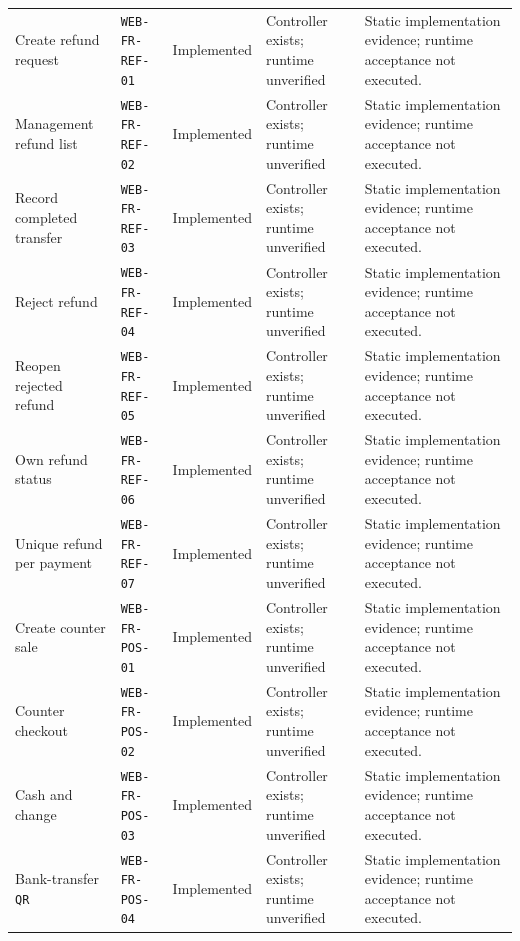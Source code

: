 \begin{longtable}{@{}P{0.19000\SRSWidth}P{0.18000\SRSWidth}P{0.15000\SRSWidth}P{0.20000\SRSWidth}P{0.28000\SRSWidth}@{}}
Create refund request & \texttt{WEB-\allowbreak{}FR-\allowbreak{}REF-\allowbreak{}01} & Implemented & Controller exists; runtime unverified & Static implementation evidence; runtime acceptance not executed. \\[3pt]
Management refund list & \texttt{WEB-\allowbreak{}FR-\allowbreak{}REF-\allowbreak{}02} & Implemented & Controller exists; runtime unverified & Static implementation evidence; runtime acceptance not executed. \\[3pt]
Record completed transfer & \texttt{WEB-\allowbreak{}FR-\allowbreak{}REF-\allowbreak{}03} & Implemented & Controller exists; runtime unverified & Static implementation evidence; runtime acceptance not executed. \\[3pt]
Reject refund & \texttt{WEB-\allowbreak{}FR-\allowbreak{}REF-\allowbreak{}04} & Implemented & Controller exists; runtime unverified & Static implementation evidence; runtime acceptance not executed. \\[3pt]
Reopen rejected refund & \texttt{WEB-\allowbreak{}FR-\allowbreak{}REF-\allowbreak{}05} & Implemented & Controller exists; runtime unverified & Static implementation evidence; runtime acceptance not executed. \\[3pt]
Own refund status & \texttt{WEB-\allowbreak{}FR-\allowbreak{}REF-\allowbreak{}06} & Implemented & Controller exists; runtime unverified & Static implementation evidence; runtime acceptance not executed. \\[3pt]
Unique refund per payment & \texttt{WEB-\allowbreak{}FR-\allowbreak{}REF-\allowbreak{}07} & Implemented & Controller exists; runtime unverified & Static implementation evidence; runtime acceptance not executed. \\[3pt]
Create counter sale & \texttt{WEB-\allowbreak{}FR-\allowbreak{}POS-\allowbreak{}01} & Implemented & Controller exists; runtime unverified & Static implementation evidence; runtime acceptance not executed. \\[3pt]
Counter checkout & \texttt{WEB-\allowbreak{}FR-\allowbreak{}POS-\allowbreak{}02} & Implemented & Controller exists; runtime unverified & Static implementation evidence; runtime acceptance not executed. \\[3pt]
Cash and change & \texttt{WEB-\allowbreak{}FR-\allowbreak{}POS-\allowbreak{}03} & Implemented & Controller exists; runtime unverified & Static implementation evidence; runtime acceptance not executed. \\[3pt]
Bank-transfer \texttt{QR} & \texttt{WEB-\allowbreak{}FR-\allowbreak{}POS-\allowbreak{}04} & Implemented & Controller exists; runtime unverified & Static implementation evidence; runtime acceptance not executed. \\[3pt]

\end{longtable}
